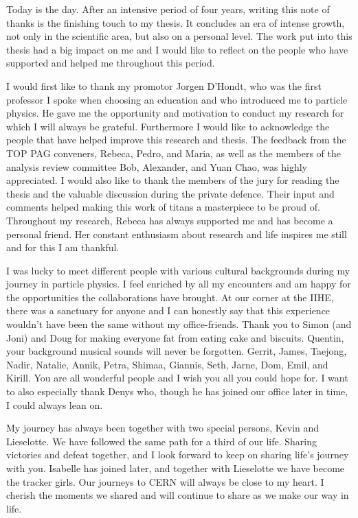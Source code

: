 Today is the day. After an intensive period of four years, writing this note of thanks is the finishing touch to my thesis. It concludes an era of intense growth, not only in the scientific area, but also on a personal level. The work put into this thesis had a big impact on me and I would like to reflect on the people who have supported and helped me throughout this period. 

I would first like to thank my promotor Jorgen D'Hondt, who was the first professor I spoke when choosing an education and who introduced me to particle physics. He gave me the opportunity and motivation to conduct my research for which I will always be grateful. Furthermore I would like to acknowledge the people that have helped improve this research and thesis. The feedback from the TOP PAG conveners, Rebeca, Pedro, and Maria,  as well as the members of the analysis review committee Bob, Alexander, and Yuan Chao, was highly appreciated. I would also like to thank the members of the jury for reading the thesis and the valuable discussion during the private defence. Their input and comments helped making this work of titans a masterpiece to be proud of. Throughout my research, Rebeca  has always supported me and has become a personal friend. Her constant enthusiasm about research and life inspires me still and for this I am thankful. 

I was lucky to meet different people with various cultural backgrounds during my journey in particle physics. I feel enriched by all my encounters and am happy for the opportunities the collaborations have brought. At our corner at the IIHE, there was a sanctuary for anyone and I can honestly say that this experience wouldn't have been the same without my office-friends. Thank you to Simon (and Joni) and Doug for making everyone fat from eating cake and biscuits. Quentin, your background musical sounds will never be forgotten.  Gerrit, James, Taejong, Nadir, Natalie, Annik, Petra, Shimaa, Giannis, Seth, Jarne, Dom, Emil, and Kirill. You are all wonderful people and I wish you all you could hope for. I want to also especially thank Denys who, though he has joined our office later in time, I could always lean on. 

My journey has always been together with two special persons, Kevin and Lieselotte. We have followed the same path for a third of our life. Sharing victories and defeat together, and I look forward to keep on sharing life's journey with you. Isabelle has joined later, and together with Lieselotte we have become the tracker girls. Our journeys to CERN will always be close to my heart. I cherish the moments we shared and will continue to share as we make our way in life. 

